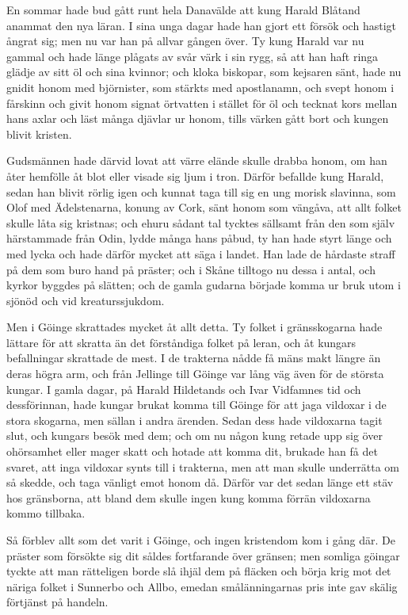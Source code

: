 \initial En sommar hade bud gått runt hela Danavälde att kung Harald Blåtand anammat den nya läran. I sina unga dagar hade han gjort ett försök och hastigt ångrat sig; men nu var han på allvar gången över. Ty kung Harald var nu gammal och hade länge plågats av svår värk i sin rygg, så att han haft ringa glädje av sitt öl och sina kvinnor; och kloka biskopar, som kejsaren sänt, hade nu gnidit honom med björnister, som stärkts med apostlanamn, och svept honom i fårskinn och givit honom signat örtvatten i stället för öl och tecknat kors mellan hans axlar och läst många djävlar ur honom, tills värken gått bort och kungen blivit kristen.

\initial Gudsmännen hade därvid lovat att värre elände skulle drabba honom, om han åter hemfölle åt blot eller visade sig ljum i tron. Därför befallde kung Harald, sedan han blivit rörlig igen och kunnat taga till sig en ung morisk slavinna, som Olof med Ädelstenarna, konung av Cork, sänt honom som vängåva, att allt folket skulle låta sig kristnas; och ehuru sådant tal tycktes sällsamt från den som själv härstammade från Odin, lydde många hans påbud, ty han hade styrt länge och med lycka och hade därför mycket att säga i landet. Han lade de hårdaste straff på dem som buro hand på präster; och i Skåne tilltogo nu dessa i antal, och kyrkor byggdes på slätten; och de gamla gudarna började komma ur bruk utom i sjönöd och vid kreaturssjukdom.

\initial Men i Göinge skrattades mycket åt allt detta. Ty folket i gränsskogarna hade lättare för att skratta än det förståndiga folket på leran, och åt kungars befallningar skrattade de mest. I de trakterna nådde få mäns makt längre än deras högra arm, och från Jellinge till Göinge var lång väg även för de största kungar. I gamla dagar, på Harald Hildetands och Ivar Vidfamnes tid och dessförinnan, hade kungar brukat komma till Göinge för att jaga vildoxar i de stora skogarna, men sällan i andra ärenden. Sedan dess hade vildoxarna tagit slut, och kungars besök med dem; och om nu någon kung retade upp sig över ohörsamhet eller mager skatt och hotade att komma dit, brukade han få det svaret, att inga vildoxar synts till i trakterna, men att man skulle underrätta om så skedde, och taga vänligt emot honom då. Därför var det sedan länge ett stäv hos gränsborna, att bland dem skulle ingen kung komma förrän vildoxarna kommo tillbaka.

\initial Så förblev allt som det varit i Göinge, och ingen kristendom kom i gång där. De präster som försökte sig dit såldes fortfarande över gränsen; men somliga göingar tyckte att man rätteligen borde slå ihjäl dem på fläcken och börja krig mot det näriga folket i Sunnerbo och Allbo, emedan smålänningarnas pris inte gav skälig förtjänst på handeln.


